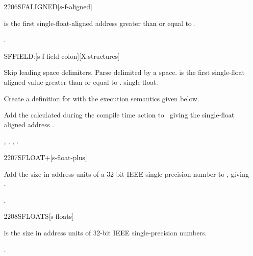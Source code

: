 \begin{worddef}{2206}{SFALIGNED}[s-f-aligned]
\item {}

	 is the first single-float-aligned address greater
	than or equal to .

\see {}.
\end{worddef}


\begin{worddef}{}{SFFIELD:}[s-f-field-colon][X:structures]
\item {}

	Skip leading space delimiters. Parse  delimited by
	a space.  is the first single-float aligned value
	greater than or equal to .  
	single-float.

	Create a definition for  with the execution semantics
	given below.

\execute[name]
\cbstart{}
\cbend

	Add the  calculated during the compile time action to
\cbstart{}\cbend\ 
	giving the single-float aligned address
\cbstart{}.\cbend

\see {},
	,
	, \linebreak
	.
\end{worddef}


\begin{worddef}{2207}{SFLOAT+}[s-float-plus]
\item {}

	Add the size in address units of a 32-bit IEEE single-precision
	number to , giving .

\see {}.
\end{worddef}


\begin{worddef}{2208}{SFLOATS}[s-floats]
\item {}

	 is the size in address units of  32-bit IEEE
	single-precision numbers.

\see {}.
\end{worddef}
